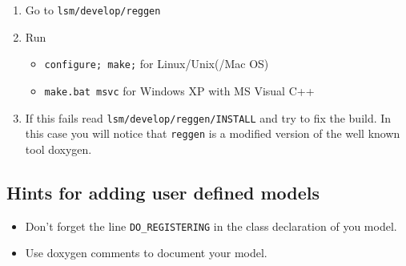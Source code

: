 \begin{enumerate}
\item Go to \verb+lsm/develop/reggen+
\item Run 
  \begin{itemize}
  \item \verb+configure; make;+ for Linux/Unix(/Mac OS)
  \item \verb+make.bat msvc+ for Windows XP with MS Visual C++ 
  \end{itemize}
\item If this fails read \verb+lsm/develop/reggen/INSTALL+ and try to fix
  the build. In this case you will notice that \verb+reggen+ is a modified
  version of the well known tool doxygen.
\end{enumerate}

\subsection{Hints for adding user defined models}

\begin{itemize}

\item Don't forget the line \verb+DO_REGISTERING+ in the class declaration of
  you model.

\item Use doxygen comments to document your model.

\end{itemize}




